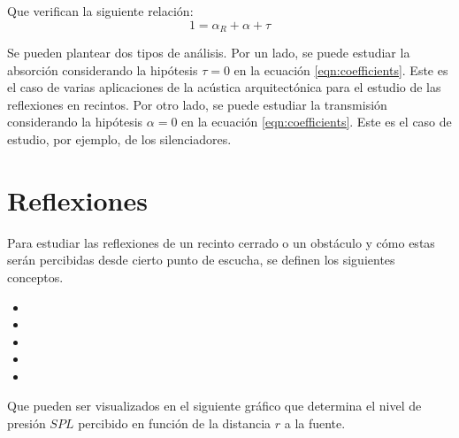 \documentclass[a5paper,12pt,twoside]{book}
\begin{document}
Que verifican la siguiente relación:
\begin{equation}
    1 = \alpha_R + \alpha + \tau
    \label{eqn:coefficients}
\end{equation}

Se pueden plantear dos tipos de análisis.
Por un lado, se puede estudiar la absorción considerando la hipótesis $\tau=0$ en la ecuación \ref{eqn:coefficients}.
Este es el caso de varias aplicaciones de la acústica arquitectónica para el estudio de las reflexiones en recintos.
Por otro lado, se puede estudiar la transmisión considerando la hipótesis $\alpha=0$ en la ecuación \ref{eqn:coefficients}.
Este es el caso de estudio, por ejemplo, de los silenciadores.


\section{Reflexiones}

Para estudiar las reflexiones de un recinto cerrado o un obstáculo y cómo estas serán percibidas desde cierto punto de escucha, se definen los siguientes conceptos.

\begin{itemize}
    \item {}
    
    \item {}
    
    \item {}
    
    \item {}
    
    \item {}
\end{itemize}

Que pueden ser visualizados en el siguiente gráfico que determina el nivel de presión $SPL$ percibido en función de la distancia $r$ a la fuente.
\end{document}
